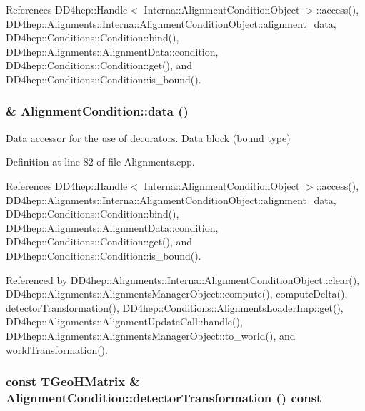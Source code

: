References DD4hep::Handle$<$ Interna::AlignmentConditionObject $>$::access(), DD4hep::Alignments::Interna::AlignmentConditionObject::alignment\_\-data, DD4hep::Conditions::Condition::bind(), DD4hep::Alignments::AlignmentData::condition, DD4hep::Conditions::Condition::get(), and DD4hep::Conditions::Condition::is\_\-bound().\hypertarget{class_d_d4hep_1_1_alignments_1_1_alignment_condition_a29cd43941dc85481f8b63ee037041006}{
\subsubsection[{data}]{ \& AlignmentCondition::data ()}}
\label{class_d_d4hep_1_1_alignments_1_1_alignment_condition_a29cd43941dc85481f8b63ee037041006}


Data accessor for the use of decorators. Data block (bound type) 

Definition at line 82 of file Alignments.cpp.

References DD4hep::Handle$<$ Interna::AlignmentConditionObject $>$::access(), DD4hep::Alignments::Interna::AlignmentConditionObject::alignment\_\-data, DD4hep::Conditions::Condition::bind(), DD4hep::Alignments::AlignmentData::condition, DD4hep::Conditions::Condition::get(), and DD4hep::Conditions::Condition::is\_\-bound().

Referenced by DD4hep::Alignments::Interna::AlignmentConditionObject::clear(), DD4hep::Alignments::AlignmentsManagerObject::compute(), computeDelta(), detectorTransformation(), DD4hep::Conditions::AlignmentsLoaderImp::get(), DD4hep::Alignments::AlignmentUpdateCall::handle(), DD4hep::Alignments::AlignmentsManagerObject::to\_\-world(), and worldTransformation().\hypertarget{class_d_d4hep_1_1_alignments_1_1_alignment_condition_ad0c399c6f6a8aefe831e1e373d4e01ef}{
\subsubsection[{detectorTransformation}]{\setlength{\rightskip}{0pt plus 5cm}const TGeoHMatrix \& AlignmentCondition::detectorTransformation () const}}
\label{class_d_d4hep_1_1_alignments_1_1_alignment_condition_ad0c399c6f6a8aefe831e1e373d4e01ef}


